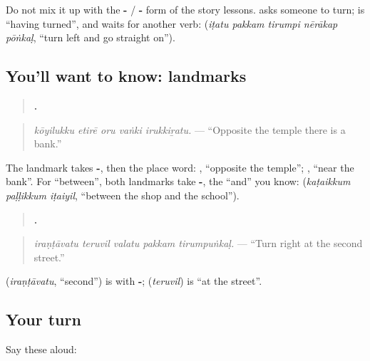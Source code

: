 Do not mix it up with the \textbf{-} / \textbf{-} form of the story lessons. \textbf{} asks someone to turn; \textbf{} is \textquotedblleft{}having turned\textquotedblright{}, and waits for another verb: \textbf{    } (\emph{iṭatu pakkam tirumpi nērākap pōṅkaḷ}, \textquotedblleft{}turn left and go straight on\textquotedblright{}).

\subsection*{You'll want to know: landmarks}
\begin{quote}
\textbf{    .}
\end{quote}

\begin{quote}
\emph{kōyilukku etirē oru vaṅki irukkiṟatu.} — \textquotedblleft{}Opposite the temple there is a bank.\textquotedblright{}
\end{quote}

The landmark takes \textbf{-}, then the place word: \textbf{ }, \textquotedblleft{}opposite the temple\textquotedblright{}; \textbf{ }, \textquotedblleft{}near the bank\textquotedblright{}. For \textquotedblleft{}between\textquotedblright{}, both landmarks take \textbf{-}, the \textquotedblleft{}and\textquotedblright{} you know: \textbf{  } (\emph{kaṭaikkum paḷḷikkum iṭaiyil}, \textquotedblleft{}between the shop and the school\textquotedblright{}).

\begin{quote}
\textbf{    .}
\end{quote}

\begin{quote}
\emph{iraṇṭāvatu teruvil valatu pakkam tirumpuṅkaḷ.} — \textquotedblleft{}Turn right at the second street.\textquotedblright{}
\end{quote}

\textbf{} (\emph{iraṇṭāvatu}, \textquotedblleft{}second\textquotedblright{}) is \textbf{} with \textbf{-}; \textbf{} (\emph{teruvil}) is \textquotedblleft{}at the street\textquotedblright{}.

\subsection*{Your turn}
Say these aloud:

